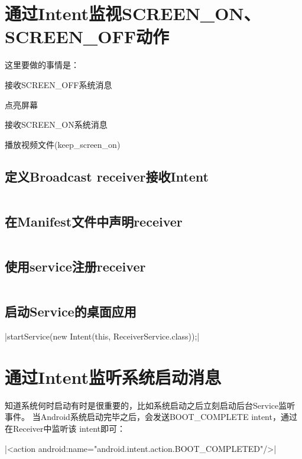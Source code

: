 ﻿\documentclass[a4paper,11pt]{article}
\begin{document}
  \section[通过Intent监视SCREEN\_ON、SCREEN\_OFF动作]{通过Intent监视SCREEN\_ON、SCREEN\_OFF动作}
  这里要做的事情是：
  \begin{coloredenumerate}
    \item 接收SCREEN\_OFF系统消息
    \item 点亮屏幕
    \item 接收SCREEN\_ON系统消息
    \item 播放视频文件(keep\_screen\_on)
  \end{coloredenumerate}
  \subsection[定义Broadcast receiver接收Intent]{定义Broadcast receiver接收Intent}
  \inputminted[linenos,tabsize=4,bgcolor=srcbg,fontsize=\small]{java}{ScreenBroadcastReceiver.java}

  \subsection[在Manifest文件中声明receiver]{在Manifest文件中声明receiver}
  \inputminted[linenos,tabsize=4,bgcolor=srcbg]{xml}{AndroidManifest.xml}

  \subsection[使用service注册receiver]{使用service注册receiver}
  \inputminted[linenos,tabsize=4,bgcolor=srcbg]{java}{ReceiverService.java}

  \subsection[启动Service的桌面应用]{启动Service的桌面应用}
  |startService(new Intent(this, ReceiverService.class));|

  \section[通过Intent监听系统启动消息]{通过Intent监听系统启动消息}
  知道系统何时启动有时是很重要的，比如系统启动之后立刻启动后台Service监听事件。
  当Android系统启动完毕之后，会发送BOOT\_COMPLETE intent，通过在Receiver中监听该
  intent即可：\par
  |<action android:name="android.intent.action.BOOT_COMPLETED"/>|
\end{document}
